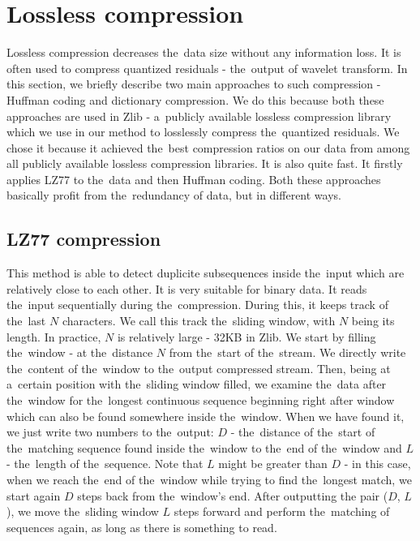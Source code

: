 \section{Lossless compression}\label{sec:dictionary_compression}

Lossless compression decreases the~data size without any information loss. It is often used to compress quantized residuals - the~output of wavelet transform. In this section, we briefly describe two main approaches to such compression - Huffman coding and dictionary compression. We do this because both these approaches are used in Zlib - a~publicly available lossless compression library which we use in our method to losslessly compress the~quantized residuals. We chose it because it achieved the~best compression ratios on our data from among all publicly available lossless compression libraries. It is also quite fast. It firstly applies LZ77 to the~data and then Huffman coding. Both these approaches basically profit from the~redundancy of data, but in different ways.

\subsection{LZ77 compression}\label{subsec:lz77}

This method is able to detect duplicite subsequences inside the~input which are relatively close to each other. It is very suitable for binary data. It reads the~input sequentially during the~compression. During this, it keeps track of the~last $N$ characters. We call this track the~sliding window, with $N$ being its length. In practice, $N$ is relatively large - 32KB in Zlib. We start by filling the~window - at the~distance $N$ from the~start of the~stream. We directly write the~content of the~window to the~output compressed stream. Then, being at a~certain position with the~sliding window filled, we examine the~data after the~window for the~longest continuous sequence beginning right after window which can also be found somewhere inside the~window. When we have found it, we just write two numbers to the~output: $D$ - the~distance of the~start of the~matching sequence found inside the~window to the~end of the~window and $L$ - the~length of the~sequence. Note that $L$ might be greater than $D$ - in this case, when we reach the~end of the~window while trying to find the~longest match, we start again $D$ steps back from the~window's end. After outputting the pair ($D$, $L$), we move the~sliding window $L$ steps forward and perform the~matching of sequences again, as long as there is something to read.

